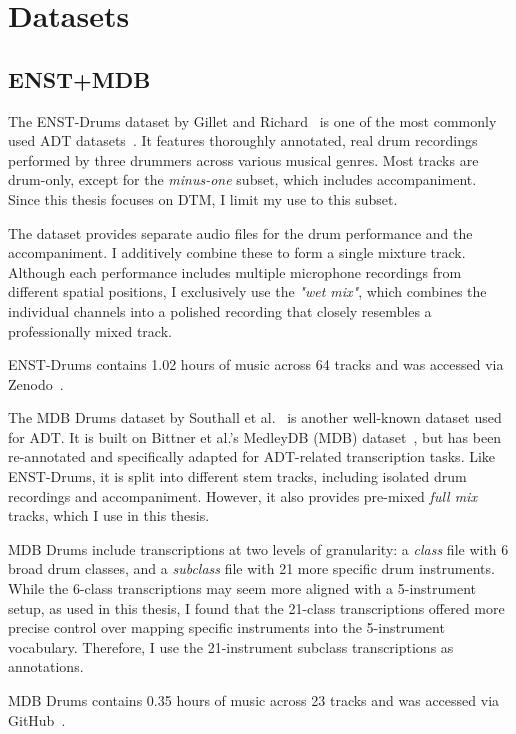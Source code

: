 \chapter{Datasets}\label{Datasets}

\section{ENST+MDB}

The ENST-Drums dataset by Gillet and Richard~\cite{gillet2006enst} is one of the most commonly used \gls{ADT} datasets~\cite{8350302}. It features thoroughly annotated, real drum recordings performed by three drummers across various musical genres. Most tracks are drum-only, except for the \textit{minus-one} subset, which includes accompaniment. Since this thesis focuses on \gls{DTM}, I limit my use to this subset.

The dataset provides separate audio files for the drum performance and the accompaniment. I additively combine these to form a single mixture track. Although each performance includes multiple microphone recordings from different spatial positions, I exclusively use the \textit{"wet mix"}, which combines the individual channels into a polished recording that closely resembles a professionally mixed track.

ENST-Drums contains 1.02 hours of music across 64 tracks and was accessed via Zenodo~\cite{gillet_2006_7432188}.

The MDB Drums dataset by Southall et al.~\cite{southall2017mdb} is another well-known dataset used for \gls{ADT}. It is built on Bittner et al.'s MedleyDB (MDB) dataset~\cite{bittner2014medleydb}, but has been re-annotated and specifically adapted for \gls{ADT}-related transcription tasks. Like ENST-Drums, it is split into different stem tracks, including isolated drum recordings and accompaniment. However, it also provides pre-mixed \textit{full mix} tracks, which I use in this thesis.

MDB Drums include transcriptions at two levels of granularity: a \textit{class} file with 6 broad drum classes, and a \textit{subclass} file with 21 more specific drum instruments. While the 6-class transcriptions may seem more aligned with a 5-instrument setup, as used in this thesis, I found that the 21-class transcriptions offered more precise control over mapping specific instruments into the 5-instrument vocabulary. Therefore, I use the 21-instrument subclass transcriptions as annotations.

MDB Drums contains 0.35 hours of music across 23 tracks and was accessed via GitHub~\cite{southall_mdbdrums_2017}.

